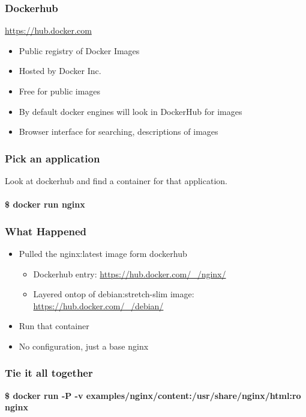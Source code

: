 \documentclass[aspectratio=169,11pt,hyperref={colorlinks=true}]{beamer}
\begin{document}
\begin{frame}
    \frametitle{Dockerhub}
    \href{https:/hub.docker.com}{https://hub.docker.com}
    \begin{itemize}
        \item Public registry of Docker Images
        \item Hosted by Docker Inc.
        \item Free for public images
        \item By default docker engines will look in DockerHub for images
        \item Browser interface for searching, descriptions of images
    \end{itemize}
\end{frame}

\begin{frame}
    \frametitle{Pick an application}
    Look at dockerhub and find a container for that application. \\ \\
    {\LARGE \textbf{\$ docker run nginx}}
\end{frame}

\begin{frame}
    \frametitle{What Happened}
    \begin{itemize}
        \item Pulled the nginx:latest image form dockerhub
            \begin{itemize}
                \item Dockerhub entry: \href{https://hub.docker.com/\_/nginx/}{https://hub.docker.com/\_/nginx/}
                \item Layered ontop of debian:stretch-slim image: \href{https://hub.docker.com/\_/debian/}{https://hub.docker.com/\_/debian/}
            \end{itemize}
        \item Run that container
        \item No configuration, just a base nginx
    \end{itemize}
\end{frame}

\begin{frame}
    \frametitle{Tie it all together}
    \textbf{\$ docker run -P -v examples/nginx/content:/usr/share/nginx/html:ro nginx}
\end{frame}
\end{document}
